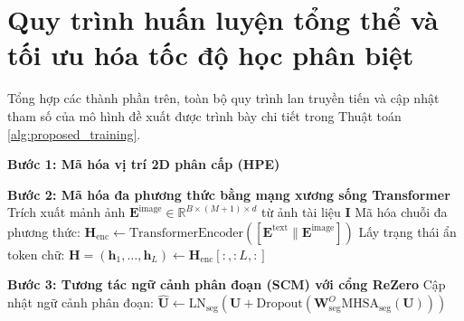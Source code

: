 \section{Quy trình huấn luyện tổng thể và tối ưu hóa tốc độ học phân biệt}
Tổng hợp các thành phần trên, toàn bộ quy trình lan truyền tiến và cập nhật tham số của mô hình đề xuất được trình bày chi tiết trong Thuật toán \ref{alg:proposed_training}.

\begin{algorithm}[htbp]
\small
\SetAlgoLined
\DontPrintSemicolon
{}

\BlankLine
\textbf{Bước 1: Mã hóa vị trí 2D phân cấp (HPE)}\;

\BlankLine
\textbf{Bước 2: Mã hóa đa phương thức bằng mạng xương sống Transformer}\;
Trích xuất mảnh ảnh $\mathbf{E}^{\text{image}} \in \mathbb{R}^{B \times (M+1) \times d}$ từ ảnh tài liệu $\mathbf{I}$\;
Mã hóa chuỗi đa phương thức: $\mathbf{H}_{\text{enc}} \leftarrow \text{TransformerEncoder}([\mathbf{E}^{\text{text}} \| \mathbf{E}^{\text{image}}])$\;
Lấy trạng thái ẩn token chữ: $\mathbf{H} = (\mathbf{h}_1, \dots, \mathbf{h}_L) \leftarrow \mathbf{H}_{\text{enc}}[:, :L, :]$\;

\BlankLine
\textbf{Bước 3: Tương tác ngữ cảnh phân đoạn (SCM) với cổng ReZero}\;
Cập nhật ngữ cảnh phân đoạn: $\hat{\mathbf{U}} \leftarrow \text{LN}_{\text{seg}}(\mathbf{U} + \text{Dropout}(\mathbf{W}_{\text{seg}}^O \text{MHSA}_{\text{seg}}(\mathbf{U})))$\;


\end{algorithm}
